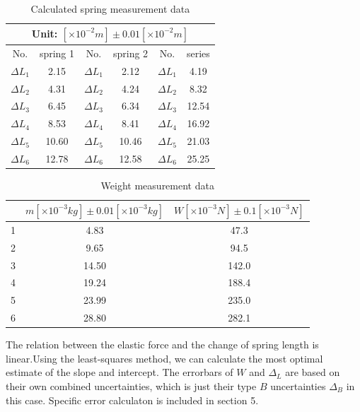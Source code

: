     \begin{table}[htbp]
        \centering
        \begin{tabular}{|c|c|c|c|c|c|}
            \hline
            \multicolumn{6}{|c|}{Unit: $[\times 10^{-2}m]\pm 0.01[\times 10^{-2}m]$}\\ \hline
            No. & spring 1 & No. & spring 2 & No. & series\\ \hline
            $\Delta {L_1}$ & 2.15 & $\Delta {L_1}$ & 2.12 & $\Delta {L_1}$ & 4.19\\ \hline
            $\Delta {L_2}$ & 4.31 & $\Delta {L_2}$ & 4.24 & $\Delta {L_2}$ & 8.32\\ \hline
            $\Delta {L_3}$ & 6.45 & $\Delta {L_3}$ & 6.34 & $\Delta {L_3}$ & 12.54\\ \hline
            $\Delta {L_4}$ & 8.53 & $\Delta {L_4}$ & 8.41 & $\Delta {L_4}$ & 16.92\\ \hline
            $\Delta {L_5}$ & 10.60 & $\Delta {L_5}$ & 10.46 & $\Delta {L_5}$ & 21.03\\ \hline
            $\Delta {L_6}$ & 12.78 & $\Delta {L_6}$ & 12.58 & $\Delta {L_6}$ & 25.25\\ \hline
        \end{tabular}
        \caption{Calculated spring measurement data}\label{spring*}
    \end{table}
    \begin{table}[htbp]
        \centering
        \begin{tabular}{|c|c|c|}
            \hline
            & $m[\times 10^{-3}kg]\pm 0.01[\times 10^{-3}kg]$ & $W[\times 10^{-3}N]\pm 0.1[\times 10^{-3}N]$\\ \hline
            1 & 4.83 & 47.3\\ \hline
            2 & 9.65 & 94.5\\ \hline
            3 & 14.50 & 142.0\\ \hline
            4 & 19.24 & 188.4\\ \hline
            5 & 23.99 & 235.0\\ \hline
            6 & 28.80 & 282.1\\ \hline            
        \end{tabular}
        \caption{Weight measurement data}\label{weight}
    \end{table}
    The relation between the elastic force and the change of spring length is linear.Using the least-squares method, we can calculate the most optimal estimate of the slope and intercept. The errorbars of $W$ and $\Delta_L$ are based on their own combined uncertainties, which is just their type $B$ uncertainties $\Delta_B$ in this case. Specific error calculaton is included in section 5.

